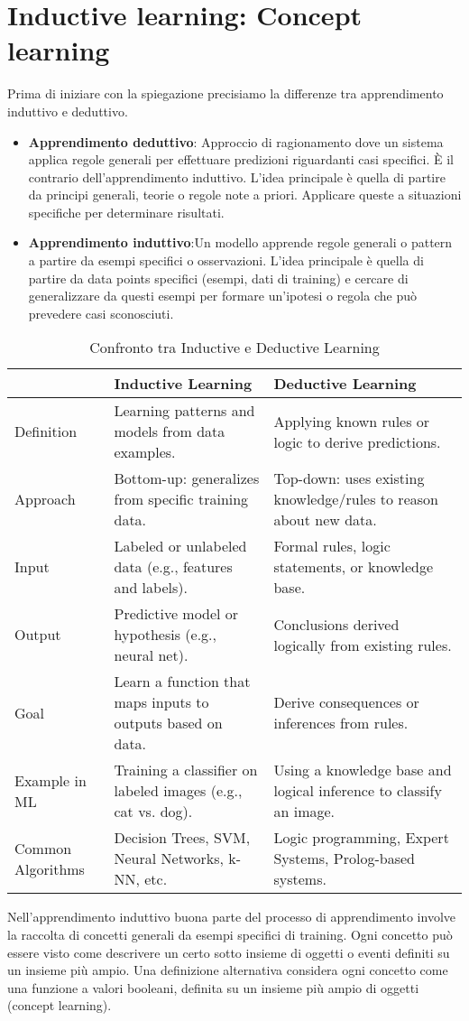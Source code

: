 \chapter{Inductive learning: Concept learning}
Prima di iniziare con la spiegazione precisiamo la differenze tra apprendimento induttivo e deduttivo.
\begin{itemize}
	\item \textbf{Apprendimento deduttivo}: Approccio di ragionamento dove un sistema applica regole generali per effettuare predizioni riguardanti casi specifici. È il contrario dell'apprendimento induttivo. 
	L'idea principale è quella di partire da principi generali, teorie o regole note a priori. Applicare queste a situazioni specifiche per determinare risultati.
	\item \textbf{Apprendimento induttivo}:Un modello apprende regole generali o pattern a partire da esempi specifici o osservazioni.
	L'idea principale è quella di partire da data points specifici (esempi, dati di training) e cercare di generalizzare da questi esempi per formare un'ipotesi o regola che può prevedere casi sconosciuti.
\end{itemize}
\begin{table}[h!]
\centering
\renewcommand{\arraystretch}{1.5}
\begin{tabular}{|m{3cm}|m{6cm}|m{6cm}|}
\hline \textbf{} & \textbf{Inductive Learning} & \textbf{Deductive Learning} \\
\hline
Definition & Learning patterns and models from data examples. & Applying known rules or logic to derive predictions. \\
\hline
Approach & Bottom-up: generalizes from specific training data. & Top-down: uses existing knowledge/rules to reason about new data. \\
\hline
Input & Labeled or unlabeled data (e.g., features and labels). & Formal rules, logic statements, or knowledge base. \\
\hline
Output & Predictive model or hypothesis (e.g., neural net). & Conclusions derived logically from existing rules. \\
\hline
Goal & Learn a function that maps inputs to outputs based on data. & Derive consequences or inferences from rules. \\
\hline
Example in ML & Training a classifier on labeled images (e.g., cat vs. dog). & Using a knowledge base and logical inference to classify an image. \\
\hline
Common Algorithms & Decision Trees, SVM, Neural Networks, k-NN, etc. & Logic programming, Expert Systems, Prolog-based systems. \\
\hline
\end{tabular}
\caption{Confronto tra Inductive e Deductive Learning}
\end{table}
Nell'apprendimento induttivo buona parte del processo di apprendimento involve la raccolta di concetti generali da esempi specifici di training.
Ogni concetto può essere visto come descrivere un certo sotto insieme di oggetti o eventi definiti su un insieme più ampio. Una definizione alternativa considera ogni concetto come una funzione a valori booleani,
definita su un insieme più ampio di oggetti (concept learning).
